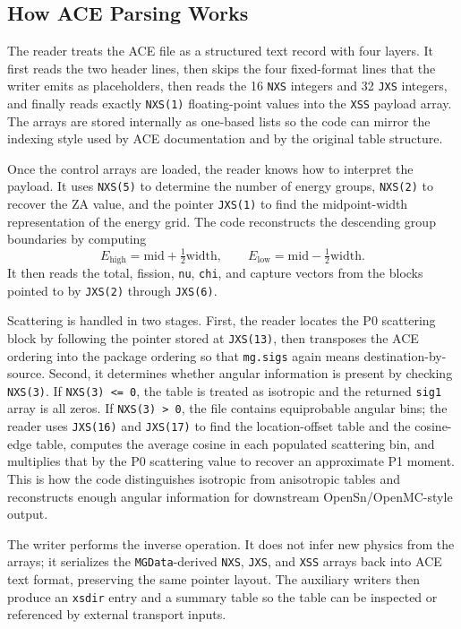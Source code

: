 \documentclass[11pt]{article}
\begin{document}
\subsection*{How ACE Parsing Works}
The reader treats the ACE file as a structured text record with four layers. It first reads the two header lines, then skips the four fixed-format lines that the writer emits as placeholders, then reads the 16 \texttt{NXS} integers and 32 \texttt{JXS} integers, and finally reads exactly \texttt{NXS(1)} floating-point values into the \texttt{XSS} payload array. The arrays are stored internally as one-based lists so the code can mirror the indexing style used by ACE documentation and by the original table structure.

Once the control arrays are loaded, the reader knows how to interpret the payload. It uses \texttt{NXS(5)} to determine the number of energy groups, \texttt{NXS(2)} to recover the ZA value, and the pointer \texttt{JXS(1)} to find the midpoint-width representation of the energy grid. The code reconstructs the descending group boundaries by computing
\[
E_{\mathrm{high}} = \mathrm{mid} + \tfrac{1}{2}\mathrm{width}, \qquad
E_{\mathrm{low}} = \mathrm{mid} - \tfrac{1}{2}\mathrm{width}.
\]
It then reads the total, fission, \texttt{nu}, \texttt{chi}, and capture vectors from the blocks pointed to by \texttt{JXS(2)} through \texttt{JXS(6)}.

Scattering is handled in two stages. First, the reader locates the P0 scattering block by following the pointer stored at \texttt{JXS(13)}, then transposes the ACE ordering into the package ordering so that \texttt{mg.sigs} again means destination-by-source. Second, it determines whether angular information is present by checking \texttt{NXS(3)}. If \texttt{NXS(3) <= 0}, the table is treated as isotropic and the returned \texttt{sig1} array is all zeros. If \texttt{NXS(3) > 0}, the file contains equiprobable angular bins; the reader uses \texttt{JXS(16)} and \texttt{JXS(17)} to find the location-offset table and the cosine-edge table, computes the average cosine in each populated scattering bin, and multiplies that by the P0 scattering value to recover an approximate P1 moment. This is how the code distinguishes isotropic from anisotropic tables and reconstructs enough angular information for downstream OpenSn/OpenMC-style output.

The writer performs the inverse operation. It does not infer new physics from the arrays; it serializes the \texttt{MGData}-derived \texttt{NXS}, \texttt{JXS}, and \texttt{XSS} arrays back into ACE text format, preserving the same pointer layout. The auxiliary writers then produce an \texttt{xsdir} entry and a summary table so the table can be inspected or referenced by external transport inputs.
\end{document}
